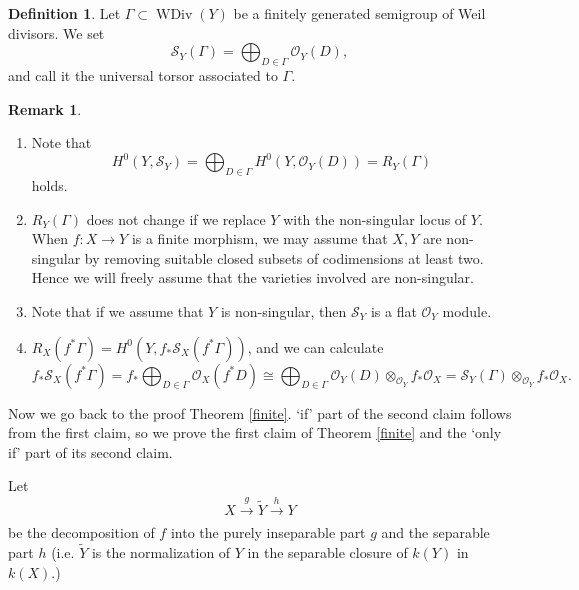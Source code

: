 \documentclass[12pt,twoside]{amsart}
\theoremstyle{definition}
\newtheorem{defi}[theo]{Definition}
\newtheorem{rem}[theo]{Remark}
\newcommand\WDivi{\mathop{\mathrm{WDiv}}\nolimits}
\begin{document}
\begin{defi}\label{universal torsor}
Let $\Gamma\subset \WDivi{(Y)}$ be a finitely generated semigroup of Weil divisors.
We set
\begin{equation*}
\mathcal{S}_Y(\Gamma)=\bigoplus_{D\in\Gamma}\mathcal{O}_Y(D),
\end{equation*}
and call it the universal torsor associated to $\Gamma$.
\end{defi}
\begin{rem}\label{remarks on universal torsor}
 \ 
 
\begin{enumerate}
\item\label{R_X and S_X} Note that
\begin{equation*}
H^0(Y,\mathcal{S}_Y)=\bigoplus_{D\in\Gamma}H^0(Y,\mathcal{O}_{Y}(D))=R_{Y}(\Gamma)
\end{equation*}
holds.
\item\label{removable}
$R_{Y}(\Gamma)$ does not change if we replace $Y$ with the non-singular locus of $Y$.
When $f:X\to Y$ is a finite morphism, we may assume that $X,Y$ are non-singular by removing suitable
closed subsets of codimensions at least two.
Hence we will freely assume that the varieties involved are non-singular.
\item\label{flat} Note that if we assume that $Y$ is non-singular, then $\mathcal{S}_Y$ is a flat $\mathcal{O}_Y$ module.
\item\label{S_X} $R_X(f^{*}\Gamma)=H^0(Y,f_{*}\mathcal{S}_X(f^{*}\Gamma))$, and we can calculate
\begin{equation*}
f_{*}\mathcal{S}_X(f^{*}\Gamma)=f_{*}\bigoplus_{D\in\Gamma}\mathcal{O}_X(f^{*}D)\cong\bigoplus_{D\in\Gamma}
\mathcal{O}_Y(D)\otimes_{\mathcal{O}_Y}f_{*}\mathcal{O}_X
=\mathcal{S}_Y(\Gamma)\otimes_{\mathcal{O}_Y}f_{*}\mathcal{O}_X.
\end{equation*}
\end{enumerate}
\end{rem}

\vspace{5mm}

Now we go back to the proof Theorem \ref{finite}. `if' part of the second claim follows
from the first claim, so we prove the first claim of Theorem \ref{finite} and the `only if' part of its
second claim.

Let
\begin{equation}
X\xrightarrow[]{g}\tilde{Y}\xrightarrow[]{h}Y 
\end{equation}
be the decomposition of $f$ into the purely inseparable part $g$
and the separable part $h$ (i.e. $\tilde{Y}$ is the normalization of $Y$
in the separable closure of $k(Y)$ in $k(X)$.)
\end{document}
